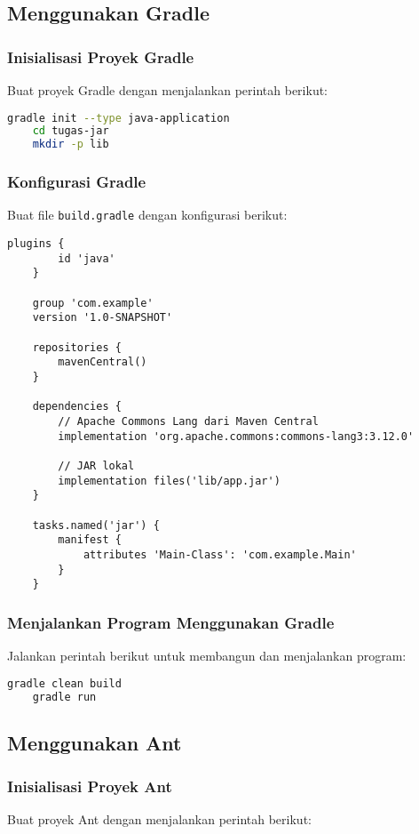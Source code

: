 \subsection{Menggunakan Gradle}
\subsubsection{Inisialisasi Proyek Gradle}
Buat proyek Gradle dengan menjalankan perintah berikut:

\begin{lstlisting}[language=bash]
	gradle init --type java-application
	cd tugas-jar
	mkdir -p lib
\end{lstlisting}

\subsubsection{Konfigurasi Gradle}
Buat file \texttt{build.gradle} dengan konfigurasi berikut:

\begin{lstlisting}[style=XmlStyle]
	plugins {
		id 'java'
	}
	
	group 'com.example'
	version '1.0-SNAPSHOT'
	
	repositories {
		mavenCentral()
	}
	
	dependencies {
		// Apache Commons Lang dari Maven Central
		implementation 'org.apache.commons:commons-lang3:3.12.0'
		
		// JAR lokal
		implementation files('lib/app.jar')
	}
	
	tasks.named('jar') {
		manifest {
			attributes 'Main-Class': 'com.example.Main'
		}
	}
\end{lstlisting}

\subsubsection{Menjalankan Program Menggunakan Gradle}
Jalankan perintah berikut untuk membangun dan menjalankan program:

\begin{lstlisting}[language=bash]
	gradle clean build
	gradle run
\end{lstlisting}

\subsection{Menggunakan Ant}
\subsubsection{Inisialisasi Proyek Ant}
Buat proyek Ant dengan menjalankan perintah berikut:

